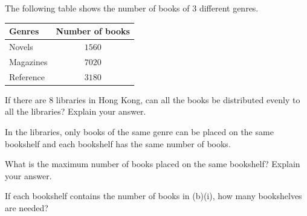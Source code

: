  The following table shows the number of books of $3$ different genres.

\begin{center}
\begin{tabular}{|l|c|}
\hline
\textbf{Genres} & \textbf{Number of books} \\
\hline
Novels & $1560$ \\
Magazines & $7020$ \\
Reference & $3180$ \\
\hline
\end{tabular}
\end{center}

\begin{subparts}
  \item If there are $8$ libraries in Hong Kong, can all the books be distributed evenly to all the libraries? Explain your answer.
  \item In the libraries, only books of the same genre can be placed on the same bookshelf and each bookshelf has the same number of books.
  \begin{subpartsii}
    \item What is the maximum number of books placed on the same bookshelf? Explain your answer.
    \item If each bookshelf contains the number of books in (b)(i), how many bookshelves are needed?
  \end{subpartsii}
\end{subparts}

